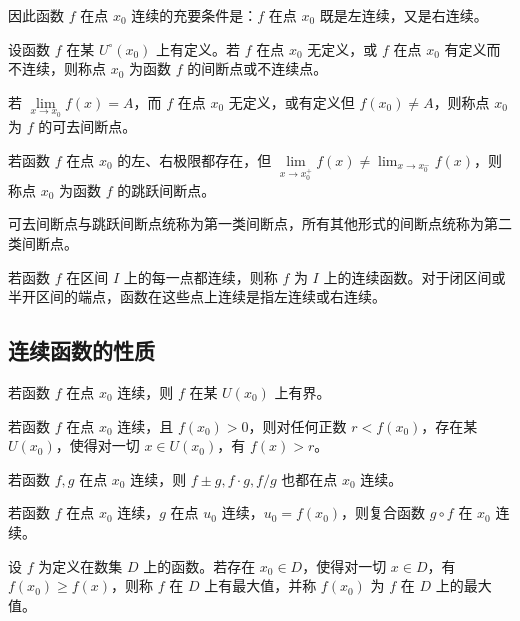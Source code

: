 因此函数 $f$ 在点 $x_0$ 连续的充要条件是：$f$ 在点 $x_0$ 既是左连续，又是右连续。

\begin{definition}[间断点]
	设函数 $f$ 在某 $U^\circ(x_0)$ 上有定义。若 $f$ 在点 $x_0$ 无定义，或 $f$ 在点 $x_0$ 有定义而不连续，则称点 $x_0$ 为函数 $f$ 的间断点或不连续点。
\end{definition}

若 $\lim\limits_{x\to x_0}f(x)=A$，而 $f$ 在点 $x_0$ 无定义，或有定义但 $f(x_0)\ne A$，则称点 $x_0$ 为 $f$ 的可去间断点。

若函数 $f$ 在点 $x_0$ 的左、右极限都存在，但 $\lim\limits_{x\to x_0^+}f(x) \ne \lim_{x\to x_0^-}f(x)$，则称点 $x_0$ 为函数 $f$ 的跳跃间断点。

可去间断点与跳跃间断点统称为第一类间断点，所有其他形式的间断点统称为第二类间断点。

若函数 $f$ 在区间 $I$ 上的每一点都连续，则称 $f$ 为 $I$ 上的连续函数。对于闭区间或半开区间的端点，函数在这些点上连续是指左连续或右连续。

\subsection{连续函数的性质}

\begin{theorem}[局部有界性]
	若函数 $f$ 在点 $x_0$ 连续，则 $f$ 在某 $U(x_0)$ 上有界。
\end{theorem}

\begin{theorem}[局部保号性]
	若函数 $f$ 在点 $x_0$ 连续，且 $f(x_0)>0$，则对任何正数 $r<f(x_0)$，存在某 $U(x_0)$，使得对一切 $x\in U(x_0)$，有 $f(x)>r$。
\end{theorem}

\begin{theorem}[四则运算]
	若函数 $f,g$ 在点 $x_0$ 连续，则 $f\pm g,f\cdot g,f/g$ 也都在点 $x_0$ 连续。
\end{theorem}

\begin{theorem}
	若函数 $f$ 在点 $x_0$ 连续，$g$ 在点 $u_0$ 连续，$u_0=f(x_0)$，则复合函数 $g\circ f$ 在 $x_0$ 连续。
\end{theorem}

\begin{definition}
	设 $f$ 为定义在数集 $D$ 上的函数。若存在 $x_0\in D$，使得对一切 $x\in D$，有 $f(x_0)\ge f(x)$，则称 $f$ 在 $D$ 上有最大值，并称 $f(x_0)$ 为 $f$ 在 $D$ 上的最大值。
\end{definition}

